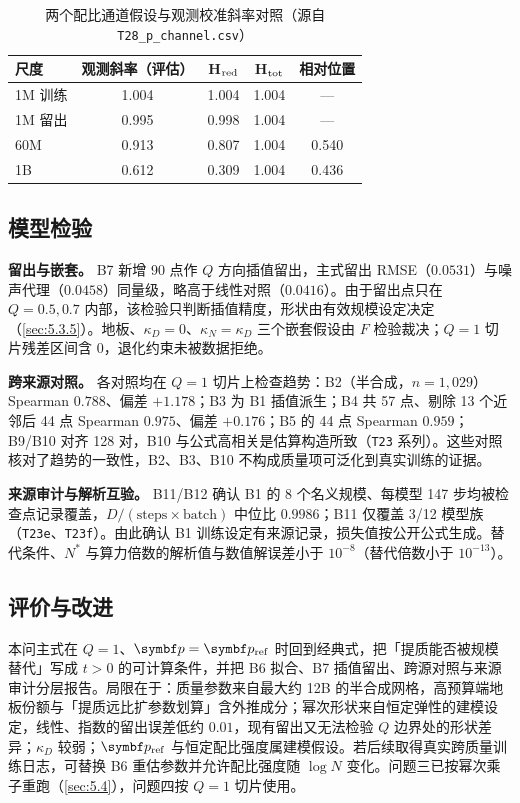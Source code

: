 \begin{table}[H]
\centering\small
\caption{两个配比通道假设与观测校准斜率对照（源自 \texttt{T28\_p\_channel.csv}）}
\label{tab:q2pchannel}
\begin{tabularx}{\textwidth}{@{}l c c c c@{}}
\toprule
尺度 & 观测斜率（评估） & H$_{\rm red}$ & H$_{\rm tot}$ & 相对位置 \\
\midrule
1M 训练 & 1.004 & 1.004 & 1.004 & — \\
1M 留出 & 0.995 & 0.998 & 1.004 & — \\
60M & 0.913 & 0.807 & 1.004 & 0.540 \\
1B & 0.612 & 0.309 & 1.004 & 0.436 \\
\bottomrule
\end{tabularx}
\end{table}

\subsection{模型检验}
\label{sec:5.3.8}

\textbf{留出与嵌套。} B7 新增 90 点作 $Q$ 方向插值留出，主式留出 RMSE（$0.0531$）与噪声代理（$0.0458$）同量级，略高于线性对照（$0.0416$）。由于留出点只在 $Q=0.5,0.7$ 内部，该检验只判断插值精度，形状由有效规模设定决定（\ref{sec:5.3.5}）。地板、$\kappa_D=0$、$\kappa_N=\kappa_D$ 三个嵌套假设由 $F$ 检验裁决；$Q=1$ 切片残差区间含 0，退化约束未被数据拒绝。

\textbf{跨来源对照。} 各对照均在 $Q=1$ 切片上检查趋势：B2（半合成，$n=1{,}029$）Spearman $0.788$、偏差 $+1.178$；B3 为 B1 插值派生；B4 共 57 点、剔除 13 个近邻后 44 点 Spearman $0.975$、偏差 $+0.176$；B5 的 44 点 Spearman $0.959$；B9/B10 对齐 128 对，B10 与公式高相关是估算构造所致（\texttt{T23} 系列）。这些对照核对了趋势的一致性，B2、B3、B10 不构成质量项可泛化到真实训练的证据。

\textbf{来源审计与解析互验。} B11/B12 确认 B1 的 8 个名义规模、每模型 147 步均被检查点记录覆盖，$D/(\text{steps}\times\text{batch})$ 中位比 $0.9986$；B11 仅覆盖 3/12 模型族（\texttt{T23e}、\texttt{T23f}）。由此确认 B1 训练设定有来源记录，损失值按公开公式生成。替代条件、$N^*$ 与算力倍数的解析值与数值解误差小于 $10^{-8}$（替代倍数小于 $10^{-13}$）。

\subsection{评价与改进}
\label{sec:5.3.9}

本问主式在 $Q=1$、$\bp=\bp_{\rm ref}$ 时回到经典式，把「提质能否被规模替代」写成 $t>0$ 的可计算条件，并把 B6 拟合、B7 插值留出、跨源对照与来源审计分层报告。局限在于：质量参数来自最大约 12B 的半合成网格，高预算端地板份额与「提质远比扩参数划算」含外推成分；幂次形状来自恒定弹性的建模设定，线性、指数的留出误差低约 $0.01$，现有留出又无法检验 $Q$ 边界处的形状差异；$\kappa_D$ 较弱；$\bp_{\rm ref}$ 与恒定配比强度属建模假设。若后续取得真实跨质量训练日志，可替换 B6 重估参数并允许配比强度随 $\log N$ 变化。问题三已按幂次乘子重跑（\ref{sec:5.4}），问题四按 $Q=1$ 切片使用。

